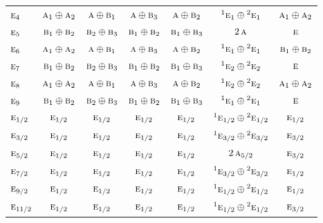 \documentclass[10pt,a4paper]{article}
\numberwithin{equation}{section}
\newcommand{\irr}[1]{\text{\normalfont\scshape #1}}
\newcommand{\conjpair}[1]{{}^{#1}}
\begin{document}
{\begin{longtable}{@{}lcccccc@{}}
$\irr{e}_{4}$ & $\irr{a}_{1}\oplus \irr{a}_{2}$ & $\irr{a}\oplus \irr{b}_{1}$ & $\irr{a}\oplus \irr{b}_{3}$ & $\irr{a}\oplus \irr{b}_{2}$ & $\conjpair{1}\irr{e}_{1}\oplus \conjpair{2}\irr{e}_{1}$ & $\irr{a}_{1}\oplus \irr{a}_{2}$\\
$\irr{e}_{5}$ & $\irr{b}_{1}\oplus \irr{b}_{2}$ & $\irr{b}_{2}\oplus \irr{b}_{3}$ & $\irr{b}_{1}\oplus \irr{b}_{2}$ & $\irr{b}_{1}\oplus \irr{b}_{3}$ & $2\,\irr{a}$ & $\irr{e}$\\
$\irr{e}_{6}$ & $\irr{a}_{1}\oplus \irr{a}_{2}$ & $\irr{a}\oplus \irr{b}_{1}$ & $\irr{a}\oplus \irr{b}_{3}$ & $\irr{a}\oplus \irr{b}_{2}$ & $\conjpair{1}\irr{e}_{1}\oplus \conjpair{2}\irr{e}_{1}$ & $\irr{b}_{1}\oplus \irr{b}_{2}$\\
$\irr{e}_{7}$ & $\irr{b}_{1}\oplus \irr{b}_{2}$ & $\irr{b}_{2}\oplus \irr{b}_{3}$ & $\irr{b}_{1}\oplus \irr{b}_{2}$ & $\irr{b}_{1}\oplus \irr{b}_{3}$ & $\conjpair{1}\irr{e}_{2}\oplus \conjpair{2}\irr{e}_{2}$ & $\irr{e}$\\
$\irr{e}_{8}$ & $\irr{a}_{1}\oplus \irr{a}_{2}$ & $\irr{a}\oplus \irr{b}_{1}$ & $\irr{a}\oplus \irr{b}_{3}$ & $\irr{a}\oplus \irr{b}_{2}$ & $\conjpair{1}\irr{e}_{2}\oplus \conjpair{2}\irr{e}_{2}$ & $\irr{a}_{1}\oplus \irr{a}_{2}$\\
$\irr{e}_{9}$ & $\irr{b}_{1}\oplus \irr{b}_{2}$ & $\irr{b}_{2}\oplus \irr{b}_{3}$ & $\irr{b}_{1}\oplus \irr{b}_{2}$ & $\irr{b}_{1}\oplus \irr{b}_{3}$ & $\conjpair{1}\irr{e}_{1}\oplus \conjpair{2}\irr{e}_{1}$ & $\irr{e}$\\
$\irr{e}_{1/2}$ & $\irr{e}_{1/2}$ & $\irr{e}_{1/2}$ & $\irr{e}_{1/2}$ & $\irr{e}_{1/2}$ & $\conjpair{1}\irr{e}_{1/2}\oplus \conjpair{2}\irr{e}_{1/2}$ & $\irr{e}_{1/2}$\\
$\irr{e}_{3/2}$ & $\irr{e}_{1/2}$ & $\irr{e}_{1/2}$ & $\irr{e}_{1/2}$ & $\irr{e}_{1/2}$ & $\conjpair{1}\irr{e}_{3/2}\oplus \conjpair{2}\irr{e}_{3/2}$ & $\irr{e}_{3/2}$\\
$\irr{e}_{5/2}$ & $\irr{e}_{1/2}$ & $\irr{e}_{1/2}$ & $\irr{e}_{1/2}$ & $\irr{e}_{1/2}$ & $2\,\irr{a}_{5/2}$ & $\irr{e}_{3/2}$\\
$\irr{e}_{7/2}$ & $\irr{e}_{1/2}$ & $\irr{e}_{1/2}$ & $\irr{e}_{1/2}$ & $\irr{e}_{1/2}$ & $\conjpair{1}\irr{e}_{3/2}\oplus \conjpair{2}\irr{e}_{3/2}$ & $\irr{e}_{1/2}$\\
$\irr{e}_{9/2}$ & $\irr{e}_{1/2}$ & $\irr{e}_{1/2}$ & $\irr{e}_{1/2}$ & $\irr{e}_{1/2}$ & $\conjpair{1}\irr{e}_{1/2}\oplus \conjpair{2}\irr{e}_{1/2}$ & $\irr{e}_{1/2}$\\
$\irr{e}_{11/2}$ & $\irr{e}_{1/2}$ & $\irr{e}_{1/2}$ & $\irr{e}_{1/2}$ & $\irr{e}_{1/2}$ & $\conjpair{1}\irr{e}_{1/2}\oplus \conjpair{2}\irr{e}_{1/2}$ & $\irr{e}_{3/2}$\\

\end{longtable}}
\end{document}
